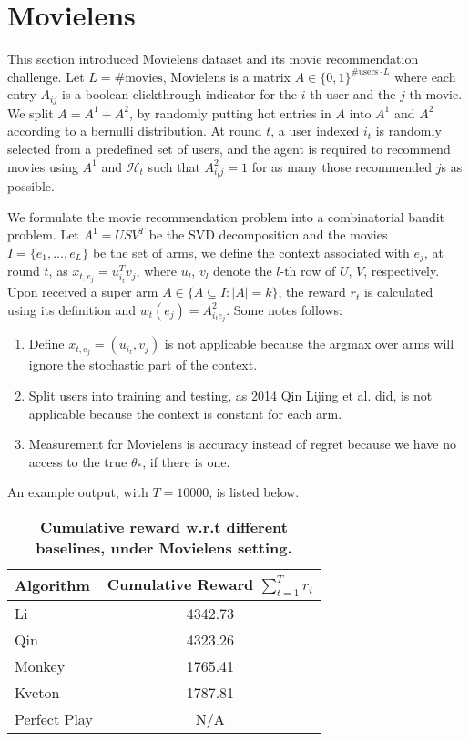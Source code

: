 \documentclass[a4paper,11pt]{article}
\begin{document}
\section{Movielens}

This section introduced Movielens dataset and its movie recommendation challenge. Let $L=\#\text{movies}$, Movielens is a matrix $A\in \{0,1\}^{\#\text{users}\cdot L}$ where each entry $A_{ij}$ is a boolean clickthrough indicator for the $i$-th user and the $j$-th movie. We split $A=A^1+A^2$, by randomly putting hot entries in $A$ into $A^1$ and $A^2$ according to a bernulli distribution. At round $t$, a user indexed $i_t$ is randomly selected from a predefined set of users, and the agent is required to recommend movies using $A^1$ and $\mathcal{H}_t$ such that $A^2_{i_tj}=1$ for as many those recommended $j$s as possible.

We formulate the movie recommendation problem into a combinatorial bandit problem. Let $A^1=USV^T$ be the SVD decomposition and the movies $I=\{e_1,\dots,e_L\}$ be the set of arms, we define the context associated with $e_j$, at round $t$, as $x_{t,e_j}=u_{i_t}^Tv_j$, where $u_l$, $v_l$ denote the $l$-th row of $U$, $V$, respectively. Upon received a super arm $A\in \{A\subseteq I: |A|=k\}$, the reward $r_t$ is calculated using its definition and $w_t(e_j)=A^2_{i_te_j}$. Some notes follows:

\begin{enumerate}

  \item Define $x_{t,e_j}=(u_{i_t}, v_j)$ is not applicable because the argmax over arms will ignore the stochastic part of the context.

  \item Split users into training and testing, as 2014 Qin Lijing et al. did, is not applicable because the context is constant for each arm.

  \item Measurement for Movielens is accuracy instead of regret because we have no access to the true $\theta_\ast$, if there is one.

\end{enumerate}

An example output, with $T=10000$, is listed below.

\begin{table}
    \centering
    \renewcommand{\arraystretch}{1.2}
	\begin{tabular}{lc}
	    \toprule
		\textbf{Algorithm}  &\textbf{Cumulative Reward $\sum_{t=1}^Tr_i $}\\
		\midrule
		Li		    &4342.73 \\
		Qin		    &4323.26 \\
		Monkey		    &1765.41 \\
		Kveton		    &1787.81 \\
		Perfect Play		    &N/A \\
		\bottomrule
	\end{tabular}
	\caption{\textbf{Cumulative reward w.r.t different baselines, under Movielens setting.}}
	\label{daily}
\end{table}
\end{document}
